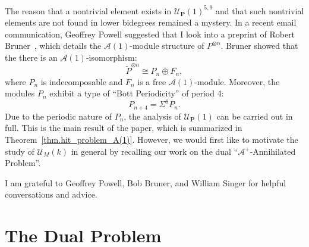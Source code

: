 \documentclass{amsart}
\theoremstyle{plain}
\theoremstyle{definition}
\theoremstyle{remark}
\begin{document}
The reason that a nontrivial element exists in
$\mathcal{U}_{\mathbf{P}}(1)^{5,9}$ and that such nontrivial elements
are not found in lower bidegrees remained a mystery.  In a recent
email communication, Geoffrey Powell suggested that I look into a
preprint of Robert Bruner~\cite{Bruner}, which details the
$\mathcal{A}(1)$-module structure of $P^{\otimes n}$.  Bruner showed
that the there is an $\mathcal{A}(1)$-isomorphism:
\begin{equation}\label{eqn.Bruner_decomp}
  \widetilde{P}^{\otimes n} \cong P_n \oplus F_n,
\end{equation}
where $P_n$ is indecomposable and $F_n$ is a free
$\mathcal{A}(1)$-module.  Moreover, the modules $P_n$ exhibit a type
of ``Bott Periodicity'' of period 4:
\[
  P_{n+4} = \Sigma^8 P_n.
\]
Due to the periodic nature of $P_n$, the analysis of
$\mathcal{U}_{\mathbf{P}}(1)$ can be carried out in full.  This is the
main result of the paper, which is summarized in
Theorem~\ref{thm.hit_problem_A(1)}.  However, we would first like to
motivate the study of $\mathcal{U}_M(k)$ in general by recalling our
work on the dual ``$\mathcal{A}^+$-Annihilated Problem''.

I am grateful to Geoffrey Powell, Bob Bruner, and William Singer for
helpful conversations and advice.

\section{The Dual Problem}\label{sec.dual}
\end{document}
